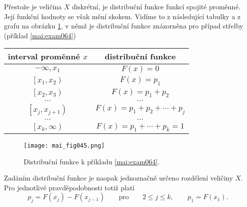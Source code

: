 
    Přestože je veličina \(X\) diskrétní, je distribuční funkce funkcí spojité proměnné. Její 
    funkční hodnoty se však mění skokem. Vidíme to z následující tabulky a z grafu na obrázku 
    \ref{mai:fig045}, v němž je distribuční funkce znázorněna pro případ střelby (příklad 
    \ref{mai:exam064})

    \begin{table}[ht!]
      \centering
      \begin{tabular}{c|c}
        \textbf{interval proměnné} \(x\)  &  \textbf{distribuční funkce}             \\ \hline
            \(-\infty, x_1\)              &    \(F(x) = 0 \)                         \\
            \(\left[x_1, x_2\right)\)     &    \(F(x) = p_1 \)                       \\
            \(\left[x_2, x_3\right)\)     &    \(F(x) = p_1 + p_2 \)                 \\
                    \(\ldots\)            &       \(\ldots\)                         \\
            \(\left[x_j, x_{j+1}\right)\) &    \(F(x) = p_1 + p_2 + \cdots + p_j \)  \\
                   \(\ldots\)             &       \(\ldots\)                         \\
            \(\left[x_k, \infty\right)\)  &    \(F(x) = p_1 + \cdots + p_k =1 \)     \\ \hline
            \end{tabular}
    \end{table}

    \begin{figure}[ht!] %
      \centering
      \texttt{[image: mai\_fig045.png]}
      \caption{Distribuční funkce k příkladu \ref{mai:exam064}. \cite[s.~233]{Musilova2009MA1}}
      \label{mai:fig045}
    \end{figure}
    Zadáním distribuční funkce je naopak jednoznačně určeno rozdělení veličiny \(X\). Pro jednotlivé
    pravděpodobnosti totiž platí
    \begin{equation*}
      p_j = F(x_j) - F(x_{j-1})\qquad\text{pro}\qquad 2\leq j \leq k, \qquad p_1 = F(x_1).
    \end{equation*}
    
